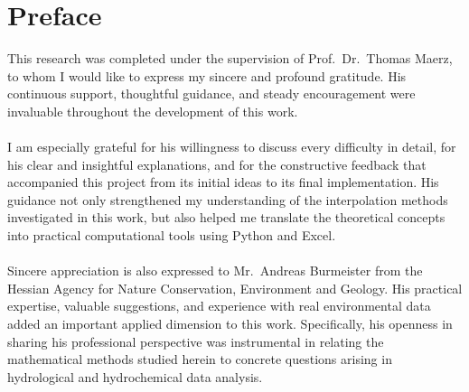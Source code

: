 \documentclass[12pt,a4paper]{article}
\begin{document}
\begin{otherlanguage}{ngerman}
\end{otherlanguage}

\newpage
\section*{Preface}

This research was completed under the supervision of Prof.\ Dr.\ Thomas Maerz, to whom I would like to express my sincere and profound gratitude. His continuous support, thoughtful guidance, and steady encouragement were invaluable throughout the development of this work.
\\
\\I am especially grateful for his willingness to discuss every difficulty in detail, for his clear and insightful explanations, and for the constructive feedback that accompanied this project from its initial ideas to its final implementation. His guidance not only strengthened my understanding of the interpolation methods investigated in this work, but also helped me translate the theoretical concepts into practical computational tools using Python and Excel.
\\
\\Sincere appreciation is also expressed to Mr.\ Andreas Burmeister from the Hessian Agency for Nature Conservation, Environment and Geology. His practical expertise, valuable suggestions, and experience with real environmental data added an important applied dimension to this work. Specifically, his openness in sharing his professional perspective was instrumental in relating the mathematical methods studied herein to concrete questions arising in hydrological and hydrochemical data analysis.

\newpage
\tableofcontents

\newpage
{}
\end{document}
